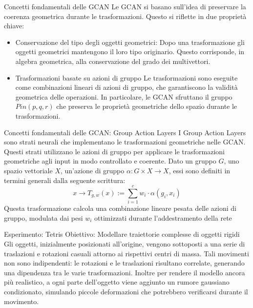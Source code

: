 \begin{frame}{Concetti fondamentali delle GCAN}
   Le GCAN si basano sull'idea di preservare la coerenza geometrica durante le trasformazioni. Questo si riflette in due proprietà chiave:
   \begin{itemize}
      \item Conservazione del tipo degli oggetti geometrici:
      Dopo una trasformazione gli oggetti geometrici mantengono il loro tipo originario. Questo corrisponde, in algebra geometrica, alla conservazione del grado dei multivettori.
      \item Trasformazioni basate su azioni di gruppo
      Le trasformazioni sono eseguite come combinazioni lineari di azioni di gruppo, che garantiscono la validità geometrica delle operazioni. In particolare, le GCAN sfruttano il gruppo\(Pin(p,q,r)\) che preserva le proprietà geometriche dello spazio durante le trasformazioni.
   \end{itemize}
\end{frame}

\begin{frame}{Concetti fondamentali delle GCAN: Group Action Layers}
   I Group Action Layers sono strati neurali che implementano le trasformazioni geometriche nelle GCAN. Questi strati utilizzano le azioni di gruppo per applicare le trasformazioni geometriche agli input in modo controllato e coerente.
   Dato un gruppo \(G\), uno spazio vettoriale \(X\), un’azione di gruppo \(\alpha:G\times X \to X\),  essi sono definiti in termini generali dalla seguente scrittura:
   \[
      x \to T_{g,w}(x):=\sum^{c}_{i=1}w_i\cdot\alpha(g_i, x_i) 
   \]
   Questa trasformazione calcola una combinazione lineare pesata delle azioni di gruppo, modulata dai pesi \(w_i\) ottimizzati durante l'addestramento della rete
\end{frame}

\begin{frame}{Esperimento: Tetris}
   Obiettivo: Modellare traiettorie complesse di oggetti rigidi\\
   Gli oggetti, inizialmente posizionati all'origine, vengono sottoposti a una serie di traslazioni e rotazioni casuali attorno ai rispettivi centri di massa.
   Tali movimenti non sono indipendenti: le rotazioni e le traslazioni risultano correlate, generando una dipendenza tra le varie trasformazioni.
   Inoltre per rendere il modello ancora più realistico, a ogni parte dell’oggetto viene aggiunto un rumore gaussiano condizionato, simulando piccole deformazioni che potrebbero verificarsi durante il movimento.
\end{frame}


